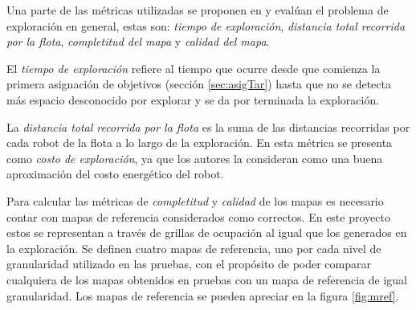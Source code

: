 Una parte de las métricas utilizadas se proponen en \cite{yan2015metrics} y
evalúan el problema de exploración en general, estas son: \emph{tiempo de
exploración}, \emph{distancia total recorrida por la flota}, \emph{completitud
del mapa} y \emph{calidad del mapa}. 

El \emph{tiempo de exploración} refiere al tiempo que ocurre desde que comienza la
primera asignación de objetivos (sección \ref{sec:asigTar}) hasta que no se
detecta más espacio desconocido por explorar y se da por terminada la
exploración.

La \emph{distancia total recorrida por la flota} es la suma de las distancias
recorridas por cada robot de la flota a lo largo de la exploración. En
\cite{yan2015metrics} esta métrica se presenta como \emph{costo de
exploración}, ya que los autores la consideran como una buena aproximación del
costo energético del robot. 


Para calcular las métricas de \emph{completitud} y \emph{calidad} de los mapas
es necesario contar con mapas de referencia considerados como correctos. En
este proyecto estos se representan a través de grillas de ocupación al igual
que los generados en la exploración. Se definen cuatro mapas de
referencia, uno por cada nivel de granularidad utilizado en las pruebas, con el
propósito de poder comparar cualquiera de los mapas obtenidos en pruebas con
un mapa de referencia de igual granularidad. Los mapas de referencia se pueden
apreciar en la figura \ref{fig:mref}. 

